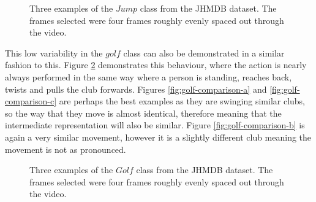 \begin{figure}[ht]
	\centering
	\caption{Three examples of the $Jump$ class from the JHMDB dataset. The frames selected were four frames roughly evenly spaced out through the video.}
	\label{fig:jump-comparison}
\end{figure}

This low variability in the $golf$ class can also be demonstrated in a similar fashion to this. Figure \ref{fig:golf-comparison} demonstrates this behaviour, where the action is nearly always performed in the same way where a person is standing, reaches back, twists and pulls the club forwards. Figures \ref{fig:golf-comparison-a} and \ref{fig:golf-comparison-c} are perhaps the best examples as they are swinging similar clubs, so the way that they move is almost identical, therefore meaning that the intermediate representation will also be similar. Figure \ref{fig:golf-comparison-b} is again a very similar movement, however it is a slightly different club meaning the movement is not as pronounced. 

\begin{figure}[ht]
	\centering
	\caption{Three examples of the $Golf$ class from the JHMDB dataset. The frames selected were four frames roughly evenly spaced out through the video.}
	\label{fig:golf-comparison}
\end{figure}

